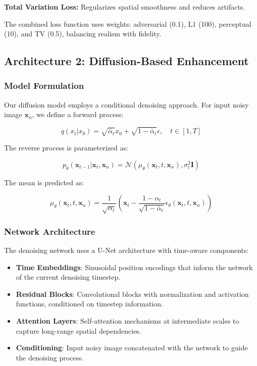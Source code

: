 \documentclass[10pt,conference,letterpaper]{IEEEtran}
\begin{document}
\textbf{Total Variation Loss:} Regularizes spatial smoothness and reduces artifacts.

The combined loss function uses weights: adversarial (0.1), L1 (100), perceptual (10), and TV (0.5), balancing realism with fidelity.

\subsection{Architecture 2: Diffusion-Based Enhancement}
\label{subsec:diffusion}

\subsubsection{Model Formulation}

Our diffusion model employs a conditional denoising approach. For input noisy image $\mathbf{x}_n$, we define a forward process:

$$q(x_t | x_0) = \sqrt{\bar{\alpha}_t} x_0 + \sqrt{1 - \bar{\alpha}_t} \epsilon, \quad t \in [1, T]$$

The reverse process is parameterized as:

$$p_\theta(\mathbf{x}_{t-1} | \mathbf{x}_t, \mathbf{x}_n) = \mathcal{N}(\mu_\theta(\mathbf{x}_t, t, \mathbf{x}_n), \sigma_t^2 \mathbf{I})$$

The mean is predicted as:

$$\mu_\theta(\mathbf{x}_t, t, \mathbf{x}_n) = \frac{1}{\sqrt{\alpha_t}} \left( \mathbf{x}_t - \frac{1 - \alpha_t}{\sqrt{1 - \bar{\alpha}_t}} \epsilon_\theta(\mathbf{x}_t, t, \mathbf{x}_n) \right)$$

\subsubsection{Network Architecture}

The denoising network uses a U-Net architecture with time-aware components:

\begin{itemize}
  \item \textbf{Time Embeddings}: Sinusoidal position encodings that inform the network of the current denoising timestep.
  
  \item \textbf{Residual Blocks}: Convolutional blocks with normalization and activation functions, conditioned on timestep information.
  
  \item \textbf{Attention Layers}: Self-attention mechanisms at intermediate scales to capture long-range spatial dependencies.
  
  \item \textbf{Conditioning}: Input noisy image concatenated with the network to guide the denoising process.
\end{itemize}
\end{document}
